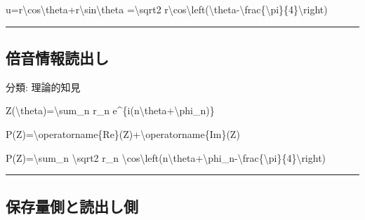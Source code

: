 \documentclass[
  a4paper,
]{ltjsarticle}
\newenvironment{Shaded}{}{}
\newcommand{\NormalTok}[1]{#1}
\begin{document}
\begin{Shaded}
\begin{Highlighting}[]
\NormalTok{u=r\textbackslash{}cos\textbackslash{}theta+r\textbackslash{}sin\textbackslash{}theta}
\NormalTok{=\textbackslash{}sqrt2 r\textbackslash{}cos\textbackslash{}left(\textbackslash{}theta{-}\textbackslash{}frac\{\textbackslash{}pi\}\{4\}\textbackslash{}right)}
\end{Highlighting}
\end{Shaded}

\begin{center}\rule{0.5\linewidth}{0.5pt}\end{center}

\subsection{倍音情報読出し}\label{ux500dux97f3ux60c5ux5831ux8aadux51faux3057}

分類: 理論的知見

\begin{Shaded}
\begin{Highlighting}[]
\NormalTok{Z(\textbackslash{}theta)=\textbackslash{}sum\_n r\_n e\^{}\{i(n\textbackslash{}theta+\textbackslash{}phi\_n)\}}
\end{Highlighting}
\end{Shaded}

\begin{Shaded}
\begin{Highlighting}[]
\NormalTok{P(Z)=\textbackslash{}operatorname\{Re\}(Z)+\textbackslash{}operatorname\{Im\}(Z)}
\end{Highlighting}
\end{Shaded}

\begin{Shaded}
\begin{Highlighting}[]
\NormalTok{P(Z)=\textbackslash{}sum\_n \textbackslash{}sqrt2 r\_n}
\NormalTok{\textbackslash{}cos\textbackslash{}left(n\textbackslash{}theta+\textbackslash{}phi\_n{-}\textbackslash{}frac\{\textbackslash{}pi\}\{4\}\textbackslash{}right)}
\end{Highlighting}
\end{Shaded}

\begin{center}\rule{0.5\linewidth}{0.5pt}\end{center}

\subsection{保存量側と読出し側}\label{ux4fddux5b58ux91cfux5074ux3068ux8aadux51faux3057ux5074}
\end{document}
